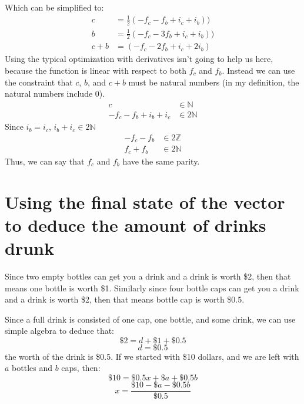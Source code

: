 \documentclass[letterpaper, 12pt]{article}
\begin{document}
Which can be simplified to:
\begin{align*}
    c &= \frac{1}{2}(-f_c - f_b  + i_c + i_b))\\
    b &= \frac{1}{2}(-f_c - 3f_b + i_c + i_b))\\
    c + b &= (-f_c - 2f_b + i_c + 2i_b)
\end{align*}
Using the typical optimization with derivatives isn't going to help us here, because the function is linear with respect to both $f_c$ and $f_b$.
Instead we can use the constraint that $c$, $b$, and $c + b$ must be natural numbers (in my definition, the natural numbers include 0).
\begin{align*}
    c &\in \mathbb{N} \\
    -f_c - f_b + i_b + i_c &\in 2\mathbb{N}
\end{align*}
Since $i_b = i_c$, $i_b + i_c \in 2\mathbb{N}$
\begin{align*}
    -f_c - f_b &\in 2\mathbb{Z}\\
    f_c + f_b &\in 2\mathbb{N}
\end{align*}
Thus, we can say that $f_c$ and $f_b$ have the same parity.
\section{Using the final state of the vector to deduce the amount of drinks drunk}
\par Since two empty bottles can get you a drink and a drink is worth \$2, then that means one bottle is worth \$1.
Similarly since four bottle caps can get you a drink and a drink is worth \$2, then that means bottle cap is worth \$0.5.
\par Since a full drink is consisted of one cap, one bottle, and some drink, we can use simple algebra to deduce that:
\begin{equation}
    \$2 = d + \$1 + \$0.5
\end{equation}
\begin{equation}
    d = \$0.5
\end{equation}
the worth of the drink is \$0.5.
If we started with \$10 dollars, and we are left with $a$ bottles and $b$ caps, then:
\begin{equation}
    \$10 = \$0.5x + \$a + \$0.5b
\end{equation}
\begin{equation}
    x = \frac{\$10 - \$a - \$0.5b}{\$0.5}
\end{equation}
\end{document}
